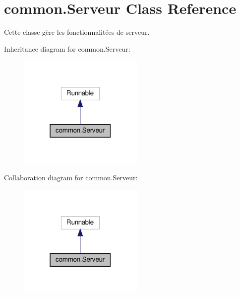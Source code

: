 \hypertarget{classcommon_1_1Serveur}{}\section{common.\+Serveur Class Reference}
\label{classcommon_1_1Serveur}


Cette classe gère les fonctionnalitées de serveur.  




Inheritance diagram for common.\+Serveur\+:
\nopagebreak
\begin{figure}[H]
\begin{center}
\leavevmode
\includegraphics[width=171pt]{classcommon_1_1Serveur__inherit__graph}
\end{center}
\end{figure}


Collaboration diagram for common.\+Serveur\+:
\nopagebreak
\begin{figure}[H]
\begin{center}
\leavevmode
\includegraphics[width=171pt]{classcommon_1_1Serveur__coll__graph}
\end{center}
\end{figure}
